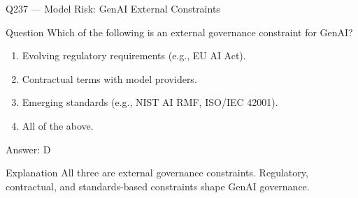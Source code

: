 \documentclass[aspectratio=169,8pt]{beamer}
\begin{document}
																																												\begin{frame}{Q237 --- Model Risk: GenAI External Constraints}
																																													\begin{block}{Question}
																																														Which of the following is an external governance constraint for GenAI?
																																														\begin{enumerate}
																																															\item Evolving regulatory requirements (e.g., EU AI Act).
																																															\item Contractual terms with model providers.
																																															\item Emerging standards (e.g., NIST AI RMF, ISO/IEC 42001).
																																															\item All of the above.
																																														\end{enumerate}  \end{block}
																																														\begin{exampleblock}{Answer: D}\end{exampleblock}
																																														\begin{block}{Explanation}
																																															All three are external governance constraints. Regulatory, contractual, and standards-based constraints shape GenAI governance.
																																														\end{block}
																																													\end{frame}
																																													
\end{document}
